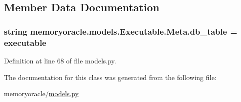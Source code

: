 \subsection{Member Data Documentation}
\hypertarget{classmemoryoracle_1_1models_1_1Executable_1_1Meta_a54a6fadfefe4208844cf283cb523d707}{}
\subsubsection[{db\+\_\+table}]{\setlength{\rightskip}{0pt plus 5cm}string memoryoracle.\+models.\+Executable.\+Meta.\+db\+\_\+table = \textquotesingle{}executable\textquotesingle{}\hspace{0.3cm}{\ttfamily [static]}}\label{classmemoryoracle_1_1models_1_1Executable_1_1Meta_a54a6fadfefe4208844cf283cb523d707}


Definition at line 68 of file models.\+py.



The documentation for this class was generated from the following file\+:\begin{DoxyCompactItemize}
\item 
memoryoracle/\hyperlink{models_8py}{models.\+py}\end{DoxyCompactItemize}
